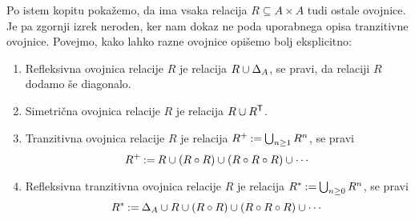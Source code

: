 Po istem kopitu pokažemo, da ima vsaka relacija $R \subseteq A \times A$ tudi ostale
ovojnice. Je pa zgornji izrek neroden, ker nam dokaz ne poda uporabnega opisa
tranzitivne ovojnice. Povejmo, kako lahko razne ovojnice opišemo bolj
eksplicitno:
%
\begin{enumerate}
\item Refleksivna ovojnica relacije $R$ je relacija $R \cup \diag[A]$, se pravi, da
  relaciji $R$ dodamo še diagonalo.
\item 
  Simetrična ovojnica relacije $R$ je relacija $R \cup \transpose{R}$.
\item
  Tranzitivna ovojnica relacije $R$ je relacija $R^{+} \defeq \bigcup_{n \geq 1} R^n$, se pravi
  \begin{equation*}
    R^{+} \defeq R \cup (R \circ R) \cup (R \circ R \circ R) \cup \cdots
  \end{equation*}
\item
  Refleksivna tranzitivna ovojnica relacije $R$ je relacija $R^{*} \defeq \bigcup_{n \geq 0} R^n$, se pravi
  \begin{equation*}
  R^{*} \defeq \diag[A] \cup R \cup (R \circ R) \cup (R \circ R \circ R) \cup \cdots
  \end{equation*}
\end{enumerate}